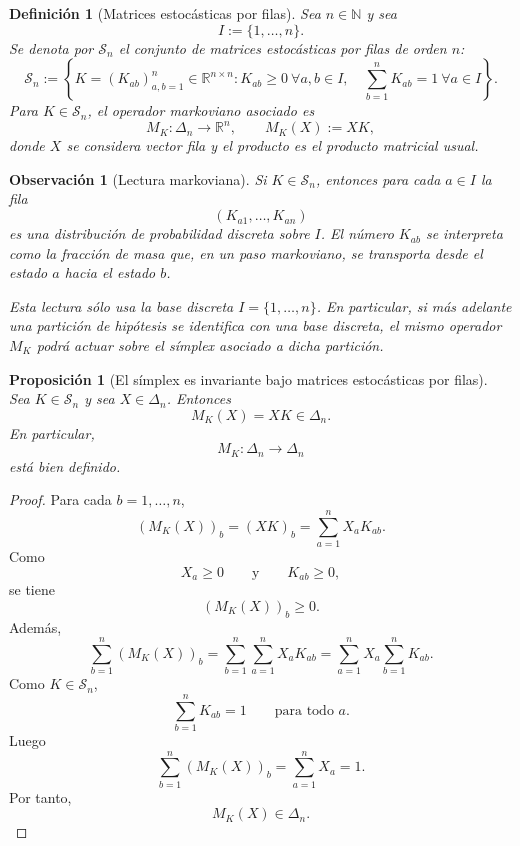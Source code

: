 \documentclass[12pt]{article}
\newtheorem{definicion}{Definición}[section]
\newtheorem{proposicion}{Proposición}[section]
\newtheorem{observacion}{Observación}[section]
\begin{document}
\begin{definicion}[Matrices estocásticas por filas]\label{def:Sn_markov}
Sea $n\in\mathbb N$ y sea
\[
I:=\{1,\dots,n\}.
\]
Se denota por $\mathcal S_n$ el conjunto de matrices estocásticas por filas de orden $n$:
\[
\mathcal S_n
:=
\left\{
K=(K_{ab})_{a,b=1}^n\in\mathbb R^{n\times n}
:
K_{ab}\ge 0\ \forall a,b\in I,
\quad
\sum_{b=1}^n K_{ab}=1\ \forall a\in I
\right\}.
\]
Para $K\in\mathcal S_n$, el operador markoviano asociado es
\[
M_K:\Delta_n\longrightarrow\mathbb R^n,
\qquad
M_K(X):=XK,
\]
donde $X$ se considera vector fila y el producto es el producto matricial usual.
\end{definicion}

\begin{observacion}[Lectura markoviana]
Si $K\in\mathcal S_n$, entonces para cada $a\in I$ la fila
\[
(K_{a1},\dots,K_{an})
\]
es una distribución de probabilidad discreta sobre $I$. El número $K_{ab}$ se interpreta como la fracción de masa que, en un paso markoviano, se transporta desde el estado $a$ hacia el estado $b$.

Esta lectura sólo usa la base discreta $I=\{1,\dots,n\}$. En particular, si más adelante una partición de hipótesis se identifica con una base discreta, el mismo operador $M_K$ podrá actuar sobre el símplex asociado a dicha partición.
\end{observacion}

\begin{proposicion}[El símplex es invariante bajo matrices estocásticas por filas]\label{prop:simplex_invariante_markov}
Sea $K\in\mathcal S_n$ y sea $X\in\Delta_n$. Entonces
\[
M_K(X)=XK\in\Delta_n.
\]
En particular,
\[
M_K:\Delta_n\longrightarrow\Delta_n
\]
está bien definido.
\end{proposicion}

\begin{proof}
Para cada $b=1,\dots,n$,
\[
(M_K(X))_b
=
(XK)_b
=
\sum_{a=1}^n X_aK_{ab}.
\]
Como
\[
X_a\ge 0
\qquad\text{y}\qquad
K_{ab}\ge 0,
\]
se tiene
\[
(M_K(X))_b\ge 0.
\]
Además,
\[
\sum_{b=1}^n(M_K(X))_b
=
\sum_{b=1}^n\sum_{a=1}^n X_aK_{ab}
=
\sum_{a=1}^n X_a\sum_{b=1}^n K_{ab}.
\]
Como $K\in\mathcal S_n$,
\[
\sum_{b=1}^n K_{ab}=1
\qquad\text{para todo }a.
\]
Luego
\[
\sum_{b=1}^n(M_K(X))_b
=
\sum_{a=1}^n X_a
=
1.
\]
Por tanto,
\[
M_K(X)\in\Delta_n.
\]
\end{proof}


\end{document}
